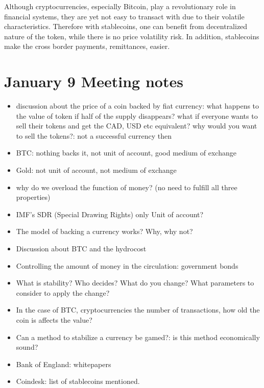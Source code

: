 Although cryptocurrencies, especially Bitcoin, play a revolutionary role in financial systems, they are yet not easy to transact with due to their volatile characteristics. Therefore with stablecoins, one can benefit from decentralized nature of the token, while there is no price volatility risk. In addition, stablecoins make the cross border payments, remittances, easier.



\section{January 9 Meeting notes}
\begin{itemize}
	\item discussion about the price of a coin backed by fiat currency:
	what happens to the value of token if half of the supply disappears?
	what if everyone wants to sell their tokens and get the CAD, USD etc equivalent?
	why would you want to sell the tokens?: not a successful currency then
	\item BTC: nothing backs it, not unit of account, good medium of exchange
	\item Gold: not unit of account, not medium of exchange
	\item why do we overload the function of money? (no need to fulfill all three properties)
	\item IMF's SDR (Special Drawing Rights) only Unit of account?
	\item The model of backing a currency works? Why, why not?
	\item Discussion about BTC and the hydrocost
	\item Controlling the amount of money in the circulation: government bonds
	\item What is stability?
	Who decides?
	What do you change?
	What parameters to consider to apply the change?
	\item In the case of BTC, cryptocurrencies the number of transactions, how old the coin is affects the value?
	\item Can a method to stabilize a currency be gamed?: is this method economically sound?
	\item Bank of England: whitepapers
	\item Coindesk: list of stablecoins mentioned.
\end{itemize}

